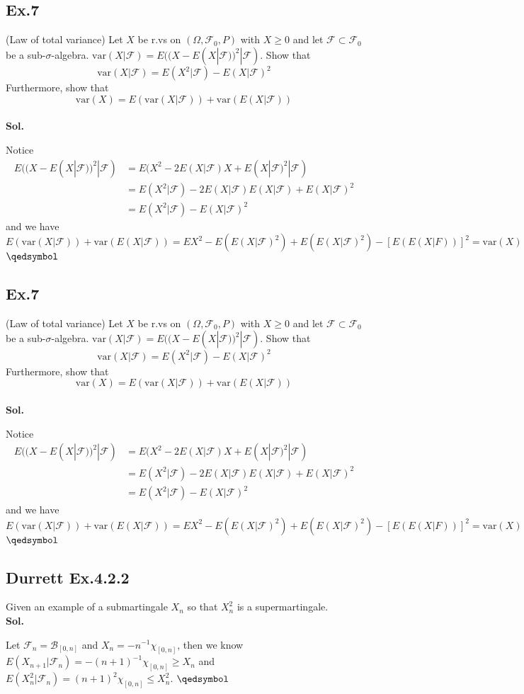 \documentclass[lang=en,11pt,a4paper,citestyle =authoryear]{elegantpaper}
\newcommand{\prvd}{$\hfill \qedsymbol$}
\newcommand{\F}{\mathcal{F}}
\begin{document}
\subsection*{Ex.7} 
(Law of total variance) Let $X$ be r.vs on $(\Omega,\F_0,P)$ with $X \geq 0$ and let $\F\subset \F_0$ be a sub-$\sigma$-algebra. $\text{var}(X|\F) = E((X-E(X|\F))^2|\F)$. Show that
\[
\text{var}(X|\F) = E(X^2|\F) - E(X|\F)^2
\]
Furthermore, show that
\[
\text{var}(X) = E(\text{var}(X|\F)) + \text{var}(E(X|\F))
\]
\vspace{0.5em}\\
\textbf{Sol.} \par
Notice
\[
\begin{aligned}
E((X-E(X|\F))^2|\F) &= E(X^2 - 2E(X|\F)X + E(X|\F)^2|\F) \\ &= E(X^2|\F) - 2E(X|\F)E(X|\F) + E(X|\F)^2 \\ &= E(X^2|\F) - E(X|\F)^2  
\end{aligned}
\]
and we have
\[
E(\text{var}(X|\F)) + \text{var}(E(X|\F)) = EX^2 - E(E(X|\F)^2) + E(E(X|\F)^2) - [E(E(X|F))]^2 = \text{var}(X) 
\]
\prvd
\vspace{0.5em}

\subsection*{Ex.7} 
(Law of total variance) Let $X$ be r.vs on $(\Omega,\F_0,P)$ with $X \geq 0$ and let $\F\subset \F_0$ be a sub-$\sigma$-algebra. $\text{var}(X|\F) = E((X-E(X|\F))^2|\F)$. Show that
\[
\text{var}(X|\F) = E(X^2|\F) - E(X|\F)^2
\]
Furthermore, show that
\[
\text{var}(X) = E(\text{var}(X|\F)) + \text{var}(E(X|\F))
\]
\vspace{0.5em}\\
\textbf{Sol.} \par
Notice
\[
\begin{aligned}
E((X-E(X|\F))^2|\F) &= E(X^2 - 2E(X|\F)X + E(X|\F)^2|\F) \\ &= E(X^2|\F) - 2E(X|\F)E(X|\F) + E(X|\F)^2 \\ &= E(X^2|\F) - E(X|\F)^2  
\end{aligned}
\]
and we have
\[
E(\text{var}(X|\F)) + \text{var}(E(X|\F)) = EX^2 - E(E(X|\F)^2) + E(E(X|\F)^2) - [E(E(X|F))]^2 = \text{var}(X) 
\]
\prvd
\vspace{0.5em}

\subsection*{Durrett Ex.4.2.2} 
Given an example of a submartingale $X_n$ so that $X_n^2$ is a supermartingale.
\vspace{0.5em}\\
\textbf{Sol.} \par
Let $\F_n = \mathcal{B}_{[0,n]}$ and $X_n = -n^{-1}\chi_{[0,n]}$, then we know $E(X_{n+1}|\F_n) = - (n+1)^{-1}\chi_{[0,n]} \geq X_n$ and $E(X_n^2|\F_n) = (n+1)^2\chi_{[0,n]} \leq X_n^2$.
\prvd
\vspace{0.5em}
\end{document}
